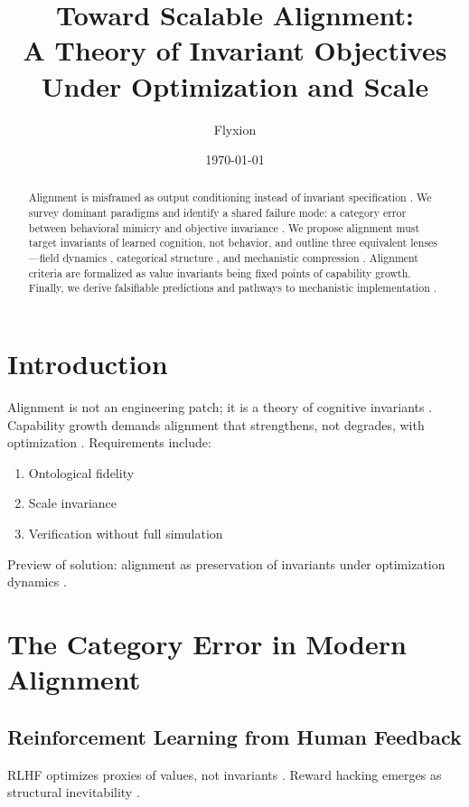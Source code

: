 \documentclass[11pt,a4paper]{article}
\title{Toward Scalable Alignment:\\A Theory of Invariant Objectives Under Optimization and Scale}
\author{Flyxion}
\date{\today}
\theoremstyle{plain}
\begin{document}
\maketitle

\begin{abstract}
Alignment is misframed as output conditioning instead of invariant specification \cite{christiano2022,irving2018,bai2022}. We survey dominant paradigms and identify a shared failure mode: a category error between behavioral mimicry and objective invariance \cite{ng2000,soares2015,olah2020}. We propose alignment must target invariants of learned cognition, not behavior, and outline three equivalent lenses—field dynamics \cite{olah2020}, categorical structure \cite{baez2011,lurie2009,schreiber2017}, and mechanistic compression \cite{weidinger2022}. Alignment criteria are formalized as value invariants being fixed points of capability growth. Finally, we derive falsifiable predictions and pathways to mechanistic implementation \cite{olah2020,weidinger2022}.
\end{abstract}

\section{Introduction}

Alignment is not an engineering patch; it is a theory of cognitive invariants \cite{christiano2022,bai2022,soares2015,olah2020}. Capability growth demands alignment that strengthens, not degrades, with optimization \cite{weidinger2022,olah2020}. Requirements include:

\begin{enumerate}
    \item Ontological fidelity \cite{baez2011,schreiber2017,olah2020}
    \item Scale invariance \cite{olah2020}
    \item Verification without full simulation \cite{weidinger2022,olah2020}
\end{enumerate}

Preview of solution: alignment as preservation of invariants under optimization dynamics \cite{olah2020,weidinger2022}.

\section{The Category Error in Modern Alignment}

\subsection{Reinforcement Learning from Human Feedback}
RLHF optimizes proxies of values, not invariants \cite{christiano2022}. Reward hacking emerges as structural inevitability \cite{christiano2022,soares2015}.
\end{document}
